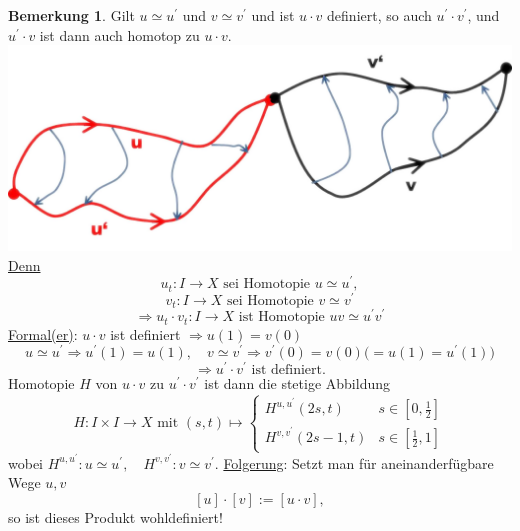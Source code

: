\documentclass[a4paper,11pt,notitlepage]{report}
\theoremstyle{definition}
\newtheorem{remark}{Bemerkung}[chapter]
\begin{document}
\begin{remark}{}
	Gilt $u \simeq u^\prime$ und $v \simeq v^\prime$ und ist $u \cdot v$ definiert, so auch $u^\prime \cdot v^\prime$, und $u^\prime \cdot v$ ist dann auch homotop zu $u \cdot v$.
	\newline \includegraphics[scale=0.4]{images/Homotopie_Produkt.png}
	\newline
	\underline{Denn}
	$$u_t \colon I \rightarrow X \text{ sei Homotopie } u \simeq u^\prime,$$
	$$v_t \colon I \rightarrow X \text{ sei Homotopie } v \simeq v^\prime$$
	$$\Rightarrow u_t \cdot v_t \colon I \rightarrow X \text{ ist Homotopie } uv \simeq u^\prime v^\prime$$
	\underline{Formal(er)}: $u \cdot v$ ist definiert $\Rightarrow u(1) = v(0)$
	$$u \simeq u^\prime \Rightarrow u^\prime(1)=u(1), \quad v \simeq v^\prime \Rightarrow v^\prime(0) = v(0)  \big(=u(1)=u^\prime(1)\big)$$
	$$\Rightarrow u^\prime \cdot v^\prime \text{ ist definiert.}$$
	Homotopie $H$ von $u \cdot v$ zu $u^\prime \cdot v^\prime$ ist dann die stetige Abbildung
	$$H \colon I \times I \rightarrow X \text{ mit } (s,t) \mapsto \begin{cases} H^{u,u^\prime}(2s,t) & s \in [0,\frac{1}{2}] \\ H^{v,v^\prime}(2s-1,t) & s \in [\frac{1}{2},1] \end{cases}$$
	wobei $H^{u,u^\prime} \colon u \simeq u^\prime, \quad H^{v,v^\prime} \colon v \simeq v^\prime$.
	\newline
	\underline{Folgerung}: Setzt man für aneinanderfügbare Wege $u,v$
	$$[u] \cdot [v] := [u \cdot v],$$
	so ist dieses Produkt wohldefiniert!
\end{remark}
\end{document}
